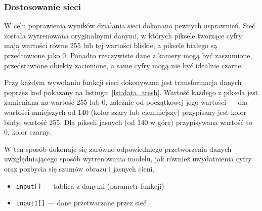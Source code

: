 \documentclass[12pt, oneside, a4paper]{article}
\begin{document}
\subsubsection{Dostosowanie sieci}
W celu poprawienia wyników działania sieci dokonano pewnych usprawnień.
Sieć została wytrenowana oryginalnymi danymi, w których piksele tworzące
cyfry mają wartości równe 255 lub tej wartości bliskie,
a piksele białego są przedtawione jako 0.
Ponadto rzeczywiste dane z kamery mogą być zaszumione,
przedstawione obiekty zacienione, a same cyfry mogą nie być idealnie czarne.

Przy każdym wywołaniu funkcji sieci dokonywana jest transformacja
danych poprzez kod pokazany na listingu~\ref{lst:data_tresh}.
Wartość każdego z piksela jest zamieniana na wartość 255 lub 0, zależnie
od początkowej jego wartości --- dla wartości mniejszych od 140
(kolor szary lub ciemniejszy) przypisany jest kolor biały, wartość 255.
Dla pikseli jasnych (od 140 w górę) przypisywana wartość to 0, kolor czarny.

W ten sposób dokonuje się zarówno odpowiedniego przetworzenia danych
uwzględniającego sposób wytrenowania modelu, jak również uwydatnienia
cyfry oraz pozbycia się szumów obrazu i jasnych cieni.

\hspace{-1cm}
\begin{minipage}{\linewidth}

\begin{itemize}
  \setlength{\itemindent}{3em}
  \item \lstinline[style=hls]{input[]} --- tablica z danymi (parametr funkcji)
  \item \lstinline[style=hls]{input1[]} --- dane przetwarzane przez sieć
\end{itemize}
\end{minipage}
\end{document}
